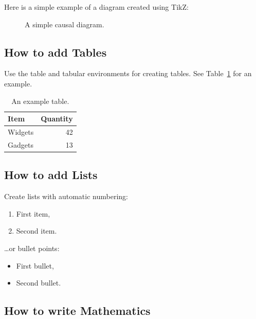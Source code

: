 \documentclass[]{article}
\begin{document}
Here is a simple example of a diagram created using TikZ:

\begin{figure}[htbp]
  \centering
\caption{\label{fig:causal}A simple causal diagram.}
\end{figure}


\subsection{How to add Tables}

Use the table and tabular environments for creating tables. See Table~\ref{tab:widgets} for an example.

\begin{table}
\centering
\begin{tabular}{l|r}
Item & Quantity \\\hline
Widgets & 42 \\
Gadgets & 13
\end{tabular}
\caption{\label{tab:widgets}An example table.}
\end{table}

\subsection{How to add Lists}

Create lists with automatic numbering:

\begin{enumerate}
  \item First item,
  \item Second item.
\end{enumerate}
\dots or bullet points:
\begin{itemize}
  \item First bullet,
  \item Second bullet.
\end{itemize}

\subsection{How to write Mathematics}
\end{document}
